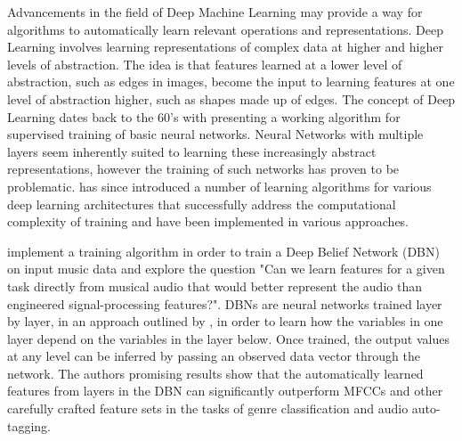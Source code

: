 \documentclass[12pt]{article}
\begin{document}
Advancements in the field of Deep Machine Learning may provide a way for algorithms to automatically learn relevant operations and representations. Deep Learning involves learning representations of complex data at higher and higher levels of abstraction. The idea is that features learned at a lower level of abstraction, such as edges in images, become the input to learning features at one level of abstraction higher, such as shapes made up of edges. The concept of Deep Learning dates back to the 60's with \citet{ivakhnenko1965cybernetic} presenting a working algorithm for supervised training of basic neural networks. Neural Networks with multiple layers seem inherently suited to learning these increasingly abstract representations, however the training of such networks has proven to be problematic. \citet{bengio2009learning} has since introduced a number of learning algorithms for various deep learning architectures that successfully address the computational complexity of training and have been implemented in various approaches.

\citet{Hamel2010LearningFeatures} implement a training algorithm in order to train a Deep Belief Network (DBN) on input music data and explore the question "Can we learn features for a given task directly from musical audio that would better represent the audio than engineered signal-processing features?". DBNs are neural networks trained layer by layer, in an approach outlined by \citet{hinton2006fast}, in order to learn how the variables in one layer depend on the variables in the layer below. Once trained, the output values at any level can be inferred by passing an observed data vector through the network. The authors promising results show that the automatically learned features from layers in the DBN can significantly outperform MFCCs and other carefully crafted feature sets in the tasks of genre classification and audio auto-tagging.
\end{document}
